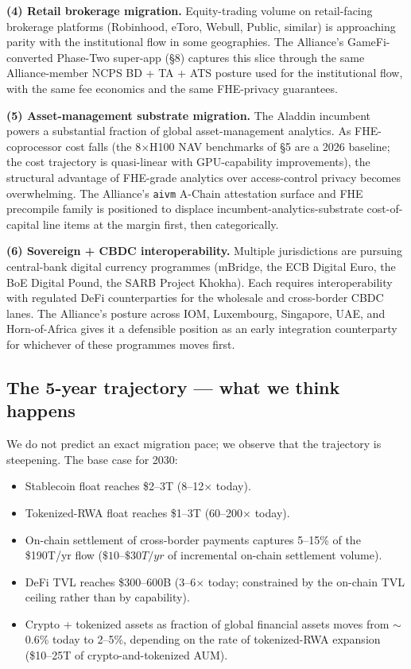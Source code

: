 \textbf{(4) Retail brokerage migration.} Equity-trading volume on
retail-facing brokerage platforms (Robinhood, eToro, Webull, Public,
similar) is approaching parity with the institutional flow in some
geographies. The Alliance's GameFi-converted Phase-Two super-app
(\S 8) captures this slice through the same Alliance-member NCPS BD
+ TA + ATS posture used for the institutional flow, with the same
fee economics and the same FHE-privacy guarantees.

\textbf{(5) Asset-management substrate migration.} The Aladdin
incumbent powers a substantial fraction of global asset-management
analytics. As FHE-coprocessor cost falls (the 8$\times$H100 NAV
benchmarks of \S 5 are a 2026 baseline; the cost trajectory is
quasi-linear with GPU-capability improvements), the structural
advantage of FHE-grade analytics over access-control privacy becomes
overwhelming. The Alliance's \texttt{aivm} A-Chain attestation
surface and FHE precompile family is positioned to displace
incumbent-analytics-substrate cost-of-capital line items at the
margin first, then categorically.

\textbf{(6) Sovereign + CBDC interoperability.} Multiple jurisdictions
are pursuing central-bank digital currency programmes (mBridge, the
ECB Digital Euro, the BoE Digital Pound, the SARB Project Khokha).
Each requires interoperability with regulated DeFi counterparties for
the wholesale and cross-border CBDC lanes. The Alliance's posture
across IOM, Luxembourg, Singapore, UAE, and Horn-of-Africa gives it a
defensible position as an early integration counterparty for whichever
of these programmes moves first.

\subsection{The 5-year trajectory --- what we think happens}

We do not predict an exact migration pace; we observe that the
trajectory is steepening. The base case for 2030:

\begin{itemize}[leftmargin=2em,itemsep=0.1em]
\item Stablecoin float reaches \$2--3T (8--12$\times$ today).
\item Tokenized-RWA float reaches \$1--3T (60--200$\times$ today).
\item On-chain settlement of cross-border payments captures 5--15\% of
the \$190T/yr flow ($\$10$--$\$30T/yr$ of incremental on-chain
settlement volume).
\item DeFi TVL reaches \$300--600B (3--6$\times$ today; constrained by
the on-chain TVL ceiling rather than by capability).
\item Crypto + tokenized assets as fraction of global financial assets
moves from $\sim$0.6\% today to 2--5\%, depending on the rate of
tokenized-RWA expansion (\$10--25T of crypto-and-tokenized AUM).
\end{itemize}

